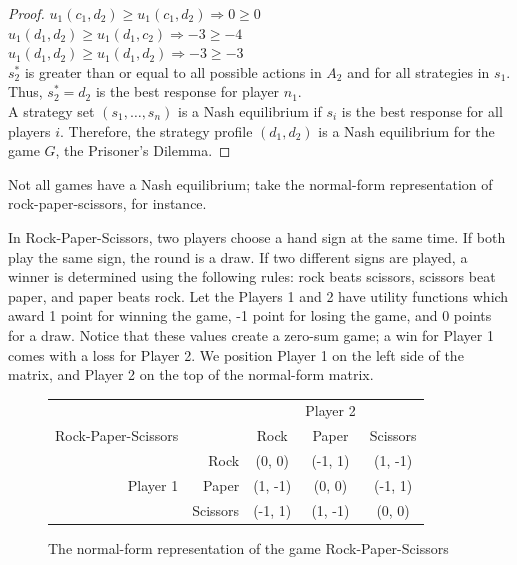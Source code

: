 \begin{proof}
  $u_1(c_1, d_2)\ge u_1(c_1, d_2) \Rightarrow 0\ge 0$\\

  $u_1(d_1, d_2)\ge u_1(d_1, c_2) \Rightarrow -3\ge -4$\\

  $u_1(d_1, d_2)\ge u_1(d_1, d_2) \Rightarrow -3\ge -3$\\

  $s^*_2$ is greater than or equal to all possible actions in $A_2$ and for all strategies in $s_1$. Thus, $s^*_2=d_2$ is the best response for player $n_1$.\\

  A strategy set $(s_1,\dots ,s_n)$ is a Nash equilibrium if $s_i$ is the best response for all players $i$. Therefore, the strategy profile $(d_1, d_2)$ is a Nash equilibrium for the game $G$, the Prisoner's Dilemma.
\end{proof}

Not all games have a Nash equilibrium; take the normal-form representation of rock-paper-scissors, for instance.

\begin{exmp}
  In Rock-Paper-Scissors, two players choose a hand sign at the same time. If both play the same sign, the round is a draw. If two different signs are played, a winner is determined using the following rules: rock beats scissors, scissors beat paper, and paper beats rock. Let the Players 1 and 2 have utility functions which award 1 point for winning the game, -1 point for losing the game, and 0 points for a draw. Notice that these values create a zero-sum game; a win for Player 1 comes with a loss for Player 2. We position Player 1 on the left side of the matrix, and Player 2 on the top of the normal-form matrix.
  \begin{figure}[H]
    \centering
    \begin{tabular}{r r | c | c | c |}
      &\multicolumn{1}{c}{}&\multicolumn{1}{c}{}&\multicolumn{1}{c}{Player 2}&\multicolumn{1}{c}{}\\
      Rock-Paper-Scissors &\multicolumn{1}{c}{}&\multicolumn{1}{c}{Rock}&\multicolumn{1}{c}{Paper}&\multicolumn{1}{c}{Scissors} \\ \cline{3-5}
      & Rock & (0, 0) & (-1, 1) & (1, -1) \\ \cline{3-5}
      Player 1 & Paper & (1, -1) & (0, 0) & (-1, 1) \\ \cline{3-5}
      & Scissors & (-1, 1) & (1, -1) & (0, 0) \\ \cline{3-5}
    \end{tabular}
    \caption{The normal-form representation of the game Rock-Paper-Scissors}
    \label{fig:RPS}
  \end{figure}
\end{exmp}

